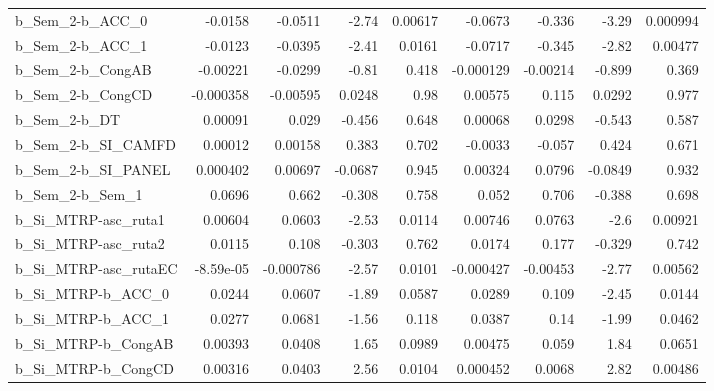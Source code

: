 \begin{tabular}{lrrrrrrrr}
b\_Sem\_2-b\_ACC\_0       &     -0.0158 &      -0.0511 &   -2.74 &  0.00617 &    -0.0673 &      -0.336 &        -3.29 &      0.000994 \\
b\_Sem\_2-b\_ACC\_1       &     -0.0123 &      -0.0395 &   -2.41 &   0.0161 &    -0.0717 &      -0.345 &        -2.82 &       0.00477 \\
b\_Sem\_2-b\_CongAB      &    -0.00221 &      -0.0299 &   -0.81 &    0.418 &  -0.000129 &    -0.00214 &       -0.899 &         0.369 \\
b\_Sem\_2-b\_CongCD      &   -0.000358 &     -0.00595 &  0.0248 &     0.98 &    0.00575 &       0.115 &       0.0292 &         0.977 \\
b\_Sem\_2-b\_DT          &     0.00091 &        0.029 &  -0.456 &    0.648 &    0.00068 &      0.0298 &       -0.543 &         0.587 \\
b\_Sem\_2-b\_SI\_CAMFD    &     0.00012 &      0.00158 &   0.383 &    0.702 &    -0.0033 &      -0.057 &        0.424 &         0.671 \\
b\_Sem\_2-b\_SI\_PANEL    &    0.000402 &      0.00697 & -0.0687 &    0.945 &    0.00324 &      0.0796 &      -0.0849 &         0.932 \\
b\_Sem\_2-b\_Sem\_1       &      0.0696 &        0.662 &  -0.308 &    0.758 &      0.052 &       0.706 &       -0.388 &         0.698 \\
b\_Si\_MTRP-asc\_ruta1   &     0.00604 &       0.0603 &   -2.53 &   0.0114 &    0.00746 &      0.0763 &         -2.6 &       0.00921 \\
b\_Si\_MTRP-asc\_ruta2   &      0.0115 &        0.108 &  -0.303 &    0.762 &     0.0174 &       0.177 &       -0.329 &         0.742 \\
b\_Si\_MTRP-asc\_rutaEC  &   -8.59e-05 &    -0.000786 &   -2.57 &   0.0101 &  -0.000427 &    -0.00453 &        -2.77 &       0.00562 \\
b\_Si\_MTRP-b\_ACC\_0     &      0.0244 &       0.0607 &   -1.89 &   0.0587 &     0.0289 &       0.109 &        -2.45 &        0.0144 \\
b\_Si\_MTRP-b\_ACC\_1     &      0.0277 &       0.0681 &   -1.56 &    0.118 &     0.0387 &        0.14 &        -1.99 &        0.0462 \\
b\_Si\_MTRP-b\_CongAB    &     0.00393 &       0.0408 &    1.65 &   0.0989 &    0.00475 &       0.059 &         1.84 &        0.0651 \\
b\_Si\_MTRP-b\_CongCD    &     0.00316 &       0.0403 &    2.56 &   0.0104 &   0.000452 &      0.0068 &         2.82 &       0.00486 \\

\end{tabular}
